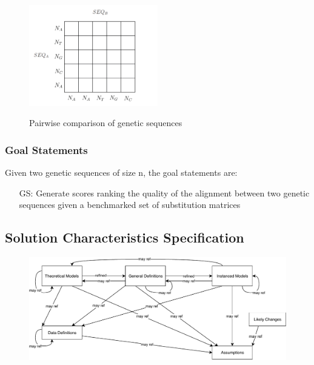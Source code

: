 \documentclass[12pt]{article}
\newcounter{goalnum} %
\begin{document}
\begin{figure}[h!]
  \begin{center}
  {
   \includegraphics[width=0.5\textwidth]{physical_system_sublimat.png}
  }
  \caption{Pairwise comparison of genetic sequences}
  \label{fig:sequence_alignment}
  \end{center}
\end{figure}

\subsubsection{Goal Statements}


\noindent Given two genetic sequences of size n, the goal statements are:

\begin{itemize}

\item[GS\refstepcounter{goalnum}\thegoalnum \label{generate_alignment}:] Generate 
scores ranking the quality of the alignment between two genetic sequences given a 
benchmarked set of substitution matrices

\end{itemize}

\subsection{Solution Characteristics Specification}

\begin{figure}[H]
  \includegraphics[scale=0.9]{RelationsBetweenTM_GD_IM_DD_A.pdf}
\end{figure}
\end{document}
